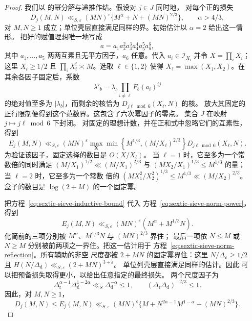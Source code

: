 \documentclass[11pt,a4paper]{article}
\numberwithin{equation}{section}
\numberwithin{figure}{section}
\theoremstyle{definition}
\theoremstyle{remark}
\begin{document}
\begin{proof}
我们以 \cite[引理~3.4--3.5]{BGL} 的幂分解与递推作结。假设对 $j\in J$ 同时地，
对每个正的损失
\begin{equation}\label{eq:sextic-sieve-inductive-bound}
 D_j(M,N)\ll_{S,\varepsilon}(MN)^\varepsilon
       \{M^\alpha+N+(MN)^{2/3}\},\qquad \alpha>4/3,
\end{equation}
对 $M,N\ge1$ 成立；单位壳层直接满足同样的界。初始估计以 $\alpha=2$ 给出这一情形。
把好的赋值理想唯一地写成
\[
 a=a_1a_2^2a_3^3a_4^4a_5^5a_6^6,
\]
其中 $a_1,\ldots,a_5$ 两两互素且无平方因子，$a_6$ 任意。代入
$a_i\in\mathcal I_{X_i}$ 并令 $X=\prod_iX_i$；这里 $X_i\ge1/2$ 且
$\prod_iX_i^i\asymp M$。选取 $\ell\in\{1,2\}$ 使得
$X_\ell=\max(X_1,X_2)$。在其余各因子固定后，系数
\[
 \lambda'_b=\lambda_b\prod_{i\ne\ell}F_b(a_i)^{ij}
\]
的绝对值至多为 $|\lambda_b|$，而剩余的核恰为 $D_{j\ell\bmod6}(X_\ell,N)$ 的核。
放大其固定的正行限制便得到这个范数界。这包含了六次幂因子的零点。
集合 $J$ 在映射 $j\mapsto j\ell\bmod6$ 下封闭。
对固定的理想计数，并在正和式中忽略它们的互素性，得到
\begin{equation}\label{eq:sextic-sieve-norm-power}
 E_j(M,N)\ll_{S,\varepsilon}(MN)^\varepsilon
 \max_{\boldsymbol X}
 \min\left\{M^{1/3},(M/X_\ell)^{2/3}\right\}
             D_{j\ell\bmod6}(X_\ell,N).
\end{equation}
为验证该因子，固定选择的数目是 $O(X/X_\ell)$。
当 $\ell=1$ 时，它至多为一个常数倍的同时满足
$(M/X_1)^{1/2}\ll(M/X_1)^{2/3}$ 与
$(MX_2/X_1)^{1/3}\le M^{1/3}$ 的量；当 $\ell=2$ 时，它至多为一个常数
倍的 $(MX_1^2/X_2^2)^{1/3}\le M^{1/3}\ll(M/X_2)^{2/3}$。
盒子的数目是 $\log(2+M)$ 的一个固定幂。

把方程~\eqref{eq:sextic-sieve-inductive-bound} 代入
方程~\eqref{eq:sextic-sieve-norm-power}，得到
\[
 E_j(M,N)\ll_{S,\varepsilon}(MN)^\varepsilon
                    (M^\alpha+M^{1/3}N).
\]
化简前的三项分别被 $M^\alpha$、$M^{1/3}N$ 与 $(MN)^{2/3}$ 界住；
最后一项依 $N\le M$ 或 $N\ge M$ 分别被前两项之一界住。把这一估计用于
方程~\eqref{eq:sextic-sieve-norm-reflection}。所有辅助的非空
尺度都被 $2+MN$ 的固定幂界住：这里 $N/\Delta_{\mathrm d}\ge1/2$ 且
$H(N/\Delta_{\mathrm d})\ll_{S,\varepsilon}(2+MN)^{3+\varepsilon}$。
单位列壳层直接满足同样的估计。因此
可以把预备损失取得更小，以给出任意指定的最终损失。
两个尺度因子为
\[
 \Delta_{\mathrm r}^{\alpha-1}\Delta_{\mathrm d}^{1-2\alpha}
       \ll_S\Delta_{\mathrm d}^{-\alpha}\le1,
 \qquad (\Delta_{\mathrm r}\Delta_{\mathrm d})^{-2/3}\le1.
\]
因此，对 $M,N\ge1$，
\begin{equation}\label{eq:sextic-sieve-norm-recurrence}
 D_j(M,N)\le E_j(M,N)\ll_{S,\varepsilon}(MN)^\varepsilon
       \{M+N^{2\alpha-1}M^{1-\alpha}+(MN)^{2/3}\}.
\end{equation}


\end{proof}
\end{document}
